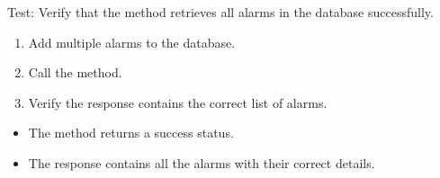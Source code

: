 \documentclass[letterpaper,10pt,english]{sphinxmanual}
\begin{document}
\begin{fulllineitems}
\label{\detokenize{test:test.test_alarm.test_list_alarms_success}}
\pysigstartsignatures
\pysiglinewithargsret
{}
{}
{}
\pysigstopsignatures
\sphinxAtStartPar
Test: Verify that the method retrieves all alarms in the database successfully.
\begin{description}
\begin{enumerate}
%
\item {} 
\sphinxAtStartPar
Add multiple alarms to the database.

\item {} 
\sphinxAtStartPar
Call the  method.

\item {} 
\sphinxAtStartPar
Verify the response contains the correct list of alarms.

\end{enumerate}

\begin{itemize}
\item {} 
\sphinxAtStartPar
The method returns a success status.

\item {} 
\sphinxAtStartPar
The response contains all the alarms with their correct details.

\end{itemize}

\end{description}

\end{fulllineitems}

\end{document}
